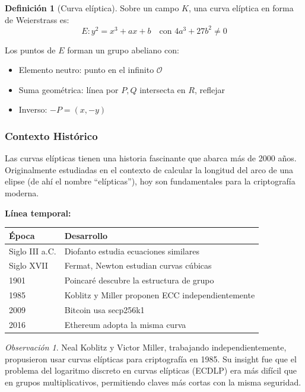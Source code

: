 \documentclass[11pt,a4paper,twoside,openright]{book}
\theoremstyle{definition}
\newtheorem{definition}{Definición}[chapter]
\theoremstyle{plain}
\theoremstyle{remark}
\newtheorem{remark}{Observación}[chapter]
\begin{document}
\begin{definition}[Curva elíptica]
Sobre un campo $K$, una curva elíptica en forma de Weierstrass es:
\[
E: y^2 = x^3 + ax + b \quad \text{con } 4a^3 + 27b^2 \neq 0
\]
\end{definition}

Los puntos de $E$ forman un grupo abeliano con:
\begin{itemize}
    \item Elemento neutro: punto en el infinito $\mathcal{O}$
    \item Suma geométrica: línea por $P, Q$ intersecta en $R$, reflejar
    \item Inverso: $-P = (x, -y)$
\end{itemize}

\subsubsection{Contexto Histórico}

\begin{intuicion}
Las curvas elípticas tienen una historia fascinante que abarca más de 2000 años. Originalmente estudiadas en el contexto de calcular la longitud del arco de una elipse (de ahí el nombre ``elípticas''), hoy son fundamentales para la criptografía moderna.
\end{intuicion}

\textbf{Línea temporal:}
\begin{center}
\begin{tabular}{ll}
\toprule
\textbf{Época} & \textbf{Desarrollo} \\
\midrule
Siglo III a.C. & Diofanto estudia ecuaciones similares \\
Siglo XVII & Fermat, Newton estudian curvas cúbicas \\
1901 & Poincaré descubre la estructura de grupo \\
1985 & Koblitz y Miller proponen ECC independientemente \\
2009 & Bitcoin usa secp256k1 \\
2016 & Ethereum adopta la misma curva \\
\bottomrule
\end{tabular}
\end{center}

\begin{remark}
Neal Koblitz y Victor Miller, trabajando independientemente, propusieron usar curvas elípticas para criptografía en 1985. Su insight fue que el problema del logaritmo discreto en curvas elípticas (ECDLP) era más difícil que en grupos multiplicativos, permitiendo claves más cortas con la misma seguridad.
\end{remark}
\end{document}
